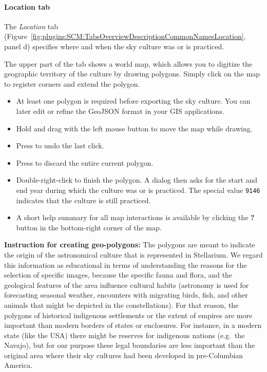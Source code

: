 \paragraph{Location tab}
The \textit{Location} tab (Figure~\ref{fig:plugins:SCM:TabsOverviewDescriptionCommonNamesLocation}, panel d) specifies where and when the sky culture was or is practiced.

The upper part of the tab shows a world map, which allows you to digitize the geographic territory of the culture by drawing polygons.
Simply click on the map to register corners and extend the polygon.
\begin{itemize}
\item At least one polygon is required before exporting the sky culture. You can later edit or refine the GeoJSON format in your GIS applications.
\item Hold \keys{\shift} and drag with the left mouse button to move the map while drawing.
\item Press  to undo the last click.
\item Press  to discard the entire current polygon.
\item Double-right-click to finish the polygon. A dialog then asks for the start and end year during which the culture was or is practiced. The special value \texttt{9146} indicates that the culture is still practiced.
\item A short help summary for all map interactions is available by clicking the \textbf{?} button in the bottom-right corner of the map.
\end{itemize}

\noindent\textbf{Instruction for creating geo-polygons:}
The polygons are meant to indicate the origin of the astronomical culture that is represented in Stellarium.
We regard this information as educational in terms of understanding the reasons for the selection of specific images, because the specific fauna and flora, and the geological features of the area influence cultural habits (astronomy is used for forecasting seasonal weather, encounters with migrating birds, fish, and other animals that might be depicted in the constellations).
For that reason, the polygons of historical indigenous settlements or the extent of empires are more important than modern borders of states or enclosures.
For instance, in a modern state (like the USA) there might be reserves for indigenous nations (e.g.\ the Navajo), but for our purpose these legal boundaries are less important than the original area where their sky cultures had been developed in pre-Columbian America.

